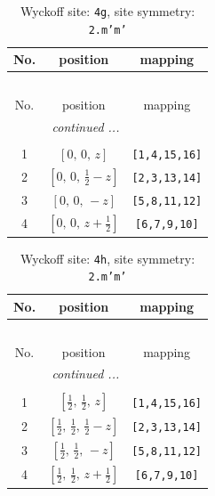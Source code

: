 \documentclass[fleqn,8pt]{jsarticle}
\begin{document}
\renewcommand{\arraystretch}{1.2}
\begin{longtable}{ccc}
\caption{Wyckoff site: {\tt 4g}, site symmetry: {\tt 2.m'm'}}
 \\
 \hline \hline
No. & position & mapping \\ \hline \endfirsthead

\multicolumn{2}{l}{\tablename\ \thetable{}} \\
 \hline \hline
No. & position & mapping \\ \hline \endhead

 \hline \hline
\multicolumn{2}{r}{\footnotesize\it continued ...} \\ \endfoot

 \hline \hline
\multicolumn{2}{r}{} \\ \endlastfoot

1 & $\left[ 0,\, 0,\, z \right]$ & {\tt [1,4,15,16]} \\ \hline
2 & $\left[ 0,\, 0,\, \frac{1}{2} - z \right]$ & {\tt [2,3,13,14]} \\ \hline
3 & $\left[ 0,\, 0,\, - z \right]$ & {\tt [5,8,11,12]} \\ \hline
4 & $\left[ 0,\, 0,\, z + \frac{1}{2} \right]$ & {\tt [6,7,9,10]} \\
\end{longtable}
\renewcommand{\arraystretch}{1.2}
\begin{longtable}{ccc}
\caption{Wyckoff site: {\tt 4h}, site symmetry: {\tt 2.m'm'}}
 \\
 \hline \hline
No. & position & mapping \\ \hline \endfirsthead

\multicolumn{2}{l}{\tablename\ \thetable{}} \\
 \hline \hline
No. & position & mapping \\ \hline \endhead

 \hline \hline
\multicolumn{2}{r}{\footnotesize\it continued ...} \\ \endfoot

 \hline \hline
\multicolumn{2}{r}{} \\ \endlastfoot

1 & $\left[ \frac{1}{2},\, \frac{1}{2},\, z \right]$ & {\tt [1,4,15,16]} \\ \hline
2 & $\left[ \frac{1}{2},\, \frac{1}{2},\, \frac{1}{2} - z \right]$ & {\tt [2,3,13,14]} \\ \hline
3 & $\left[ \frac{1}{2},\, \frac{1}{2},\, - z \right]$ & {\tt [5,8,11,12]} \\ \hline
4 & $\left[ \frac{1}{2},\, \frac{1}{2},\, z + \frac{1}{2} \right]$ & {\tt [6,7,9,10]} \\
\end{longtable}
\end{document}

